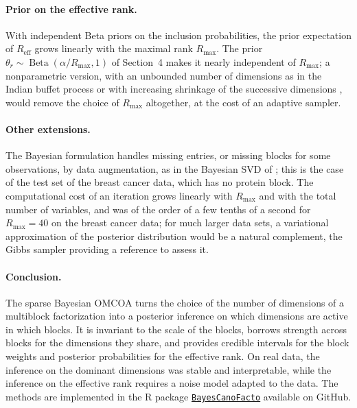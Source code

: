 \documentclass[11pt]{article}
\DeclareMathOperator{\Be}{Beta}
\newcommand{\Reff}{R_{\mathrm{eff}}}
\begin{document}
\paragraph{Prior on the effective rank.} With independent Beta priors on the inclusion probabilities, the prior expectation of $\Reff$ grows linearly with the maximal rank $R_{\max}$. The prior $\theta_r\sim\Be(\alpha/R_{\max},1)$ of Section~4 makes it nearly independent of $R_{\max}$; a nonparametric version, with an unbounded number of dimensions as in the Indian buffet process \citep{griffiths2011} or with increasing shrinkage of the successive dimensions \citep{bhattacharya2011,legramanti2020}, would remove the choice of $R_{\max}$ altogether, at the cost of an adaptive sampler.
 
\paragraph{Other extensions.} The Bayesian formulation handles missing entries, or missing blocks for some observations, by data augmentation, as in the Bayesian SVD of \citet{zhai2023}; this is the case of the test set of the breast cancer data, which has no protein block. The computational cost of an iteration grows linearly with $R_{\max}$ and with the total number of variables, and was of the order of a few tenths of a second for $R_{\max}=40$ on the breast cancer data; for much larger data sets, a variational approximation of the posterior distribution would be a natural complement, the Gibbs sampler providing a reference to assess it.
 
\paragraph{Conclusion.} The sparse Bayesian OMCOA turns the choice of the number of dimensions of a multiblock factorization into a posterior inference on which dimensions are active in which blocks. It is invariant to the scale of the blocks, borrows strength across blocks for the dimensions they share, and provides credible intervals for the block weights and posterior probabilities for the effective rank. On real data, the inference on the dominant dimensions was stable and interpretable, while the inference on the effective rank requires a noise model adapted to the data. The methods are implemented in the \textsf{R} package  \href{https://github.com/GALHARRET/BayesCanoFacto}{\texttt{BayesCanoFacto}} available on GitHub.
\end{document}
